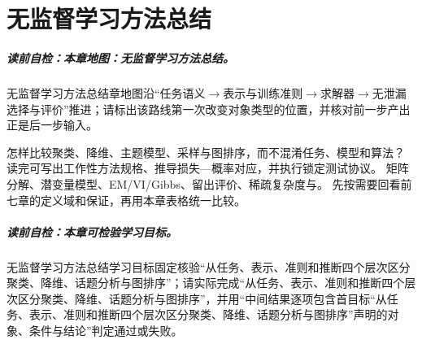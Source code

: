 
\chapter{无监督学习方法总结}\label{chap:V5-C08}

\paragraph{读前自检：本章地图：无监督学习方法总结。}无监督学习方法总结章地图沿“任务语义$\to$表示与训练准则$\to$求解器$\to$无泄漏选择与评价”推进；请标出该路线第一次改变对象类型的位置，并核对前一步产出正是后一步输入。\par

{怎样比较聚类、降维、主题模型、采样与图排序，而不混淆任务、模型和算法？}
{读完可写出工作性方法规格、推导损失—概率对应，并执行锁定测试协议。}
{矩阵分解、潜变量模型、EM/VI/Gibbs、留出评价、稀疏复杂度与\PageRank{}。}
{先按需要回看前七章的定义域和保证，再用本章表格统一比较。}

\label{struct:V5-C08-CH01}
\paragraph{读前自检：本章可检验学习目标。}无监督学习方法总结学习目标固定核验“从任务、表示、准则和推断四个层次区分聚类、降维、话题分析与图排序”；请实际完成“从任务、表示、准则和推断四个层次区分聚类、降维、话题分析与图排序”，并用“中间结果逐项包含首目标“从任务、表示、准则和推断四个层次区分聚类、降维、话题分析与图排序”声明的对象、条件与结论”判定通过或失败。\par

